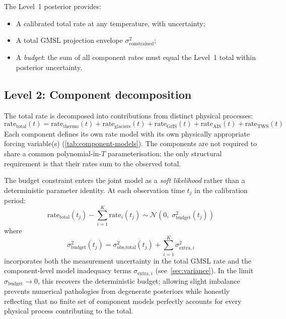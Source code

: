 \documentclass[11pt]{article}
\begin{document}
The Level~1 posterior provides:
\begin{itemize}
  \item A calibrated total rate at any temperature, with uncertainty;
  \item A total GMSL projection envelope $\sigma_{\text{constrained}}^2$;
  \item A \emph{budget}: the sum of all component rates must equal the Level~1 total within posterior uncertainty.
\end{itemize}

\subsection{Level 2: Component decomposition}

The total rate is decomposed into contributions from distinct physical processes:
\begin{equation}
  \text{rate}_{\text{total}}(t) = \text{rate}_{\text{thermo}}(t)
    + \text{rate}_{\text{glaciers}}(t)
    + \text{rate}_{\text{GrIS}}(t)
    + \text{rate}_{\text{AIS}}(t)
    + \text{rate}_{\text{TWS}}(t)
  \label{eq:budget}
\end{equation}
Each component defines its own rate model with its own physically appropriate forcing variable(s) (\cref{tab:component-models}).  The components are not required to share a common polynomial-in-$T$ parameterisation; the only structural requirement is that their rates sum to the observed total.

The budget constraint enters the joint model as a \emph{soft likelihood} rather than a deterministic parameter identity.  At each observation time $t_j$ in the calibration period:
\begin{equation}
  \text{rate}_{\text{total}}(t_j) - \sum_{i=1}^{K} \text{rate}_i(t_j)
  \sim \mathcal{N}\!\left(0,\; \sigma_{\text{budget}}^2(t_j)\right)
  \label{eq:budget-constraint}
\end{equation}
where
\begin{equation}
  \sigma_{\text{budget}}^2(t_j) = \sigma_{\text{obs,total}}^2(t_j) + \sum_{i=1}^{K} \sigma_{\text{extra},i}^2
  \label{eq:budget-tolerance}
\end{equation}
incorporates both the measurement uncertainty in the total GMSL rate and the component-level model inadequacy terms $\sigma_{\text{extra},i}$ (see~\cref{sec:variance}).  In the limit $\sigma_{\text{budget}} \to 0$, this recovers the deterministic budget; allowing slight imbalance prevents numerical pathologies from degenerate posteriors while honestly reflecting that no finite set of component models perfectly accounts for every physical process contributing to the total.
\end{document}
